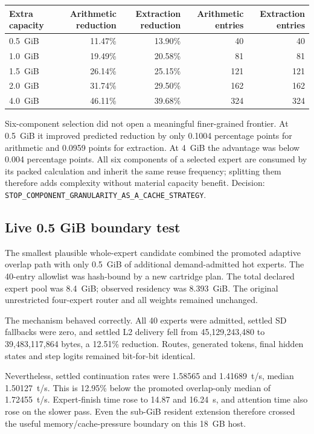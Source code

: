 \begin{center}
\begin{tabular}{lrrrr}
\toprule
Extra capacity & Arithmetic reduction & Extraction reduction & Arithmetic entries & Extraction entries \\
\midrule
0.5~GiB & 11.47\% & 13.90\% & 40 & 40 \\
1.0~GiB & 19.49\% & 20.58\% & 81 & 81 \\
1.5~GiB & 26.14\% & 25.15\% & 121 & 121 \\
2.0~GiB & 31.74\% & 29.50\% & 162 & 162 \\
4.0~GiB & 46.11\% & 39.68\% & 324 & 324 \\
\bottomrule
\end{tabular}
\end{center}

Six-component selection did not open a meaningful finer-grained frontier.  At
0.5~GiB it improved predicted reduction by only 0.1004 percentage points for
arithmetic and 0.0959 points for extraction.  At 4~GiB the advantage was below
0.004 percentage points.  All six components of a selected expert are consumed
by its packed calculation and inherit the same reuse frequency; splitting them
therefore adds complexity without material capacity benefit.  Decision:
\texttt{STOP\_COMPONENT\_GRANULARITY\_AS\_A\_CACHE\_STRATEGY}.

\subsection{Live 0.5 GiB boundary test}

The smallest plausible whole-expert candidate combined the promoted adaptive
overlap path with only 0.5~GiB of additional demand-admitted hot experts.  The
40-entry allowlist was hash-bound by a new cartridge plan.  The total declared
expert pool was 8.4~GiB; observed residency was 8.393~GiB.  The original
unrestricted four-expert router and all weights remained unchanged.

The mechanism behaved correctly.  All 40 experts were admitted, settled SD
fallbacks were zero, and settled L2 delivery fell from 45,129,243,480 to
39,483,117,864 bytes, a 12.51\% reduction.  Routes, generated tokens, final
hidden states and step logits remained bit-for-bit identical.

Nevertheless, settled continuation rates were 1.58565 and 1.41689~t/s, median
1.50127~t/s.  This is 12.95\% below the promoted overlap-only median of
1.72455~t/s.  Expert-finish time rose to 14.87 and 16.24~s, and attention time
also rose on the slower pass.  Even the sub-GiB resident extension therefore
crossed the useful memory/cache-pressure boundary on this 18~GB host.

